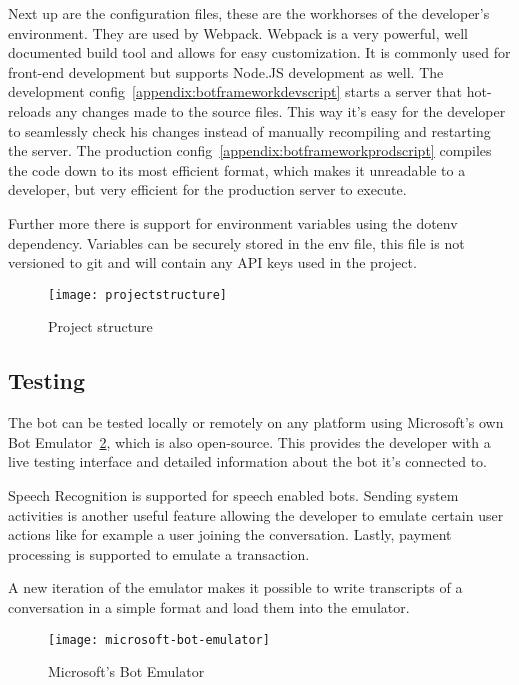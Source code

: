 Next up are the configuration files, these are the workhorses of the developer's environment. They are used by Webpack\cite{webpack}. Webpack is a very powerful, well documented build tool and allows for easy customization. It is commonly used for front-end development but supports Node.JS development as well. The development config~\ref{appendix:botframeworkdevscript} starts a server that hot-reloads any changes made to the source files. This way it's easy for the developer to seamlessly check his changes instead of manually recompiling and restarting the server. The production config~\ref{appendix:botframeworkprodscript} compiles the code down to its most efficient format, which makes it unreadable to a developer, but very efficient for the production server to execute.

Further more there is support for environment variables using the dotenv\cite{dotenv} dependency. Variables can be securely stored in the env file, this file is not versioned to git and will contain any API keys used in the project.

\begin{figure}[ht]
	\centering
	\texttt{[image: projectstructure]}\label{fig:projectstructure}
	\caption{Project structure}
\end{figure}

\subsection{Testing}

The bot can be tested locally or remotely on any platform using Microsoft's own Bot Emulator~\ref{fig:microsoft-bot-emulator}, which is also open-source. This provides the developer with a live testing interface and detailed information about the bot it's connected to.

Speech Recognition is supported for speech enabled bots. Sending system activities is another useful feature allowing the developer to emulate certain user actions like for example a user joining the conversation. Lastly, payment processing is supported to emulate a transaction.

A new iteration of the emulator makes it possible to write transcripts of a conversation in a simple format and load them into the emulator.

\begin{figure}[!hb]
	\centering
	\texttt{[image: microsoft-bot-emulator]}\label{fig:microsoft-bot-emulator}
	\caption{Microsoft's Bot Emulator~\cite{microsoft-bot-emulator}}
\end{figure}

